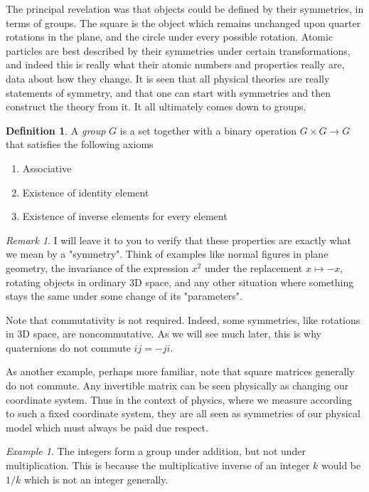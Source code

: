 \documentclass[12pt]{article}
\theoremstyle{definition}
\newtheorem{definition}{Definition}[section]
\theoremstyle{remark}
\newtheorem*{remark}{Remark}
\theoremstyle{example}
\newtheorem{example}{Example}
\theoremstyle{theorem}
\theoremstyle{lemma}
\begin{document}
The principal revelation was that objects could be defined by their symmetries, in terms of groups. The square is the object which remains unchanged upon quarter rotations in the plane, and the circle under every possible rotation. Atomic particles are best described by their symmetries under certain transformations, and indeed this is really what their atomic numbers and properties really are, data about how they change. It is seen that all physical theories are really statements of symmetry, and that one can start with symmetries and then construct the theory from it. It all ultimately comes down to groups.

\begin{definition}
	A \textit{group} $G$ is a set together with a binary operation $G\times G\to G$ that satisfies the following axioms
	\begin{enumerate}
		\item Associative
		\item Existence of identity element
		\item Existence of inverse elements for every element
	\end{enumerate}
\end{definition}

\begin{remark}
	I will leave it to you to verify that these properties are exactly what we mean by a "symmetry". Think of examples like normal figures in plane geometry, the invariance of the expression $x^2$ under the replacement $x\mapsto -x$, rotating objects in ordinary 3D space, and any other situation where something stays the same under some change of its "parameters".
	
	Note that commutativity is not required. Indeed, some symmetries, like rotations in 3D space, are noncommutative. As we will see much later, this is why quaternions do not commute $ij=-ji$.
	
	As another example, perhaps more familiar,  note that square matrices generally do not commute. Any invertible matrix can be seen physically as changing our coordinate system. Thus in the context of physics, where we measure according to such a fixed coordinate system, they are all seen as symmetries of our physical model which must always be paid due respect.
\end{remark}

\begin{example}
	The integers form a group under addition, but not under multiplication. This is because the multiplicative inverse of an integer $k$ would be $1/k$ which is not an integer generally.
\end{example}
\end{document}
